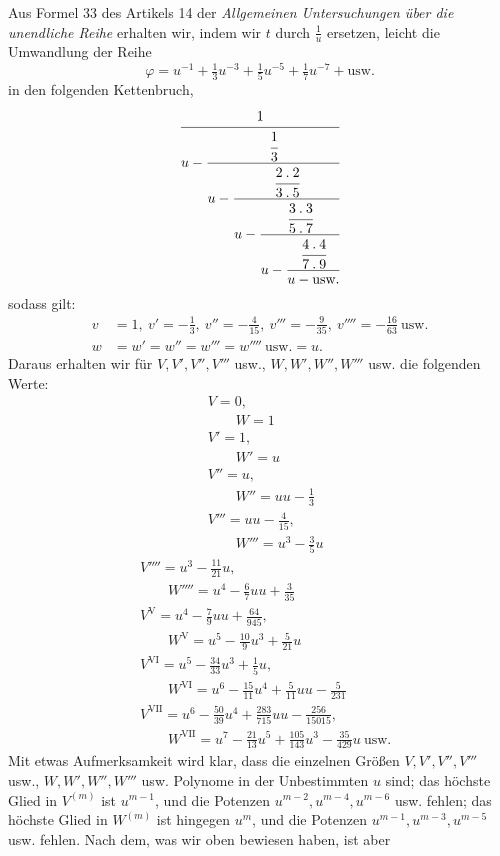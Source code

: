 Aus Formel 33 des Artikels 14 der \textit{Allgemeinen Untersuchungen über die unendliche Reihe} erhalten wir, indem wir $t$ durch $\frac1u$ ersetzen, leicht die Umwandlung der Reihe
\[
\varphi=u^{-1}+\tfrac13u^{-3}+\tfrac15u^{-5}+\tfrac17u^{-7}+\text{usw.}
\]
in den folgenden Kettenbruch,
\[
\cfrac{1}{u-\cfrac{\cfrac13}{u-\cfrac{\cfrac{2\mathbin{.}2}{3\mathbin{.}5}}{u-\cfrac{\cfrac{3\mathbin{.}3}{5\mathbin{.}7}}{u-\cfrac{\cfrac{4\mathbin{.}4}{7\mathbin{.}9}}{u-\text{usw.}}}}}}
\]
sodass gilt:
\[
\begin{aligned}
v&=1,\ v'=-\tfrac13,\ v''=-\tfrac4{15},\ v'''=-\tfrac9{35},\ v''''=-\tfrac{16}{63}\ \text{usw.}\\
w&=w'=w''=w'''=w''''\ \text{usw.}=u.
\end{aligned}
\]
Daraus erhalten wir für $V,V',V'',V'''$ usw., $W,W',W'',W'''$ usw. die folgenden Werte:
\[
\begin{aligned}&V=0,\\[5pt]&\qquad W=1\\[5pt]&V'=1,\\[5pt]&\qquad W'=u\\[5pt]&V''=u,\\[5pt]&\qquad W''=uu-\tfrac13\\[5pt]&V'''=uu-\tfrac4{15},\\[5pt]&\qquad W'''=u^3-\tfrac35u\end{aligned}\]
\[\begin{aligned}&V''''=u^3-\tfrac{11}{21}u,\\[5pt]&\qquad W''''=u^4-\tfrac67uu+\tfrac3{35}\\[5pt]&V^{\mathrm{V}}=u^4-\tfrac79uu+\tfrac{64}{945},\\[5pt]&\qquad W^{\mathrm{V}}=u^5-\tfrac{10}{9}u^3+\tfrac5{21}u\\[5pt]&V^{\mathrm{VI}}=u^5-\tfrac{34}{33}u^3+\tfrac15u,\\[5pt]&\qquad W^{\mathrm{VI}}=u^6-\tfrac{15}{11}u^4+\tfrac5{11}uu-\tfrac5{231}\\[5pt]&V^{\mathrm{VII}}=u^6-\tfrac{50}{39}u^4+\tfrac{283}{715}uu-\tfrac{256}{15015},\\[5pt]&\qquad W^{\mathrm{VII}}=u^7-\tfrac{21}{13}u^5+\tfrac{105}{143}u^3-\tfrac{35}{429}u\ \text{usw.}\end{aligned}
\]
Mit etwas Aufmerksamkeit wird klar, dass die einzelnen Größen $V,V',V'',V'''$ usw., $W,W',W'',W'''$ usw. Polynome in der Unbestimmten $u$ sind; das höchste Glied in $V^{(m)}$ ist $u^{m-1}$, und die Potenzen $u^{m-2},u^{m-4},u^{m-6}$ usw. fehlen; das höchste Glied in $W^{(m)}$ ist hingegen $u^m$, und die Potenzen $u^{m-1},u^{m-3},u^{m-5}$ usw. fehlen. Nach dem, was wir oben bewiesen haben, ist aber
